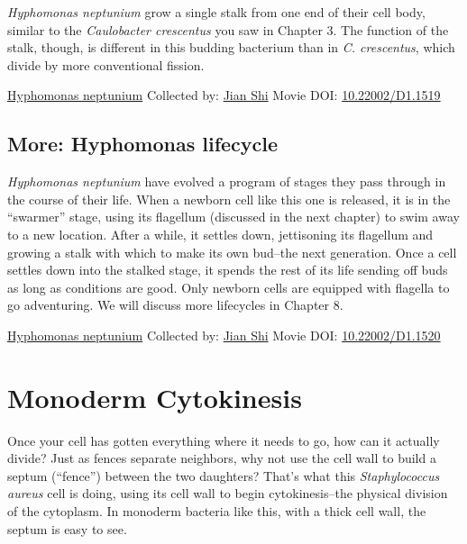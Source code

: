 \documentclass[]{tufte-book}
\begin{document}
\emph{Hyphomonas neptunium} grow a single stalk from one end of their cell body, similar to the \emph{Caulobacter crescentus} you saw in Chapter 3. The function of the stalk, though, is different in this budding bacterium than in \emph{C. crescentus}, which divide by more conventional fission.



\hypertarget{htmlwidget-1d009e8cbe69897dcff5}{}

\label{fig:5-3a}\protect\hyperlink{tree}{Hyphomonas neptunium} Collected by: \protect\hyperlink{jian_shi}{Jian Shi} Movie DOI: \href{https://doi.org/10.22002/D1.1519}{10.22002/D1.1519}

\hypertarget{Hyphomonas_lifecycle}{%
\subsection*{More: Hyphomonas lifecycle}\label{Hyphomonas_lifecycle}}

\emph{Hyphomonas neptunium} have evolved a program of stages they pass through in the course of their life. When a newborn cell like this one is released, it is in the ``swarmer'' stage, using its flagellum (discussed in the next chapter) to swim away to a new location. After a while, it settles down, jettisoning its flagellum and growing a stalk with which to make its own bud--the next generation. Once a cell settles down into the stalked stage, it spends the rest of its life sending off buds as long as conditions are good. Only newborn cells are equipped with flagella to go adventuring. We will discuss more lifecycles in Chapter 8.



\hypertarget{htmlwidget-50f0bf1d1962e00f86a3}{}

\label{fig:5-3b}\protect\hyperlink{tree}{Hyphomonas neptunium} Collected by: \protect\hyperlink{jian_shi}{Jian Shi} Movie DOI: \href{https://doi.org/10.22002/D1.1520}{10.22002/D1.1520}

\hypertarget{monoderm-cytokinesis}{%
\section{Monoderm Cytokinesis}\label{monoderm-cytokinesis}}

Once your cell has gotten everything where it needs to go, how can it actually divide? Just as fences separate neighbors, why not use the cell wall to build a septum (``fence'') between the two daughters? That's what this \emph{Staphylococcus aureus} cell is doing, using its cell wall to begin cytokinesis--the physical division of the cytoplasm. In monoderm bacteria like this, with a thick cell wall, the septum is easy to see.
\end{document}
